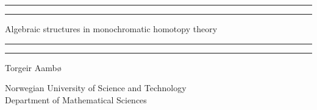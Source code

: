 
\begin{titlingpage}



    \vspace*{5cm}

    \rule[-11pt]{\textwidth}{1pt}
    \rule{\textwidth}{0.5pt}

    \begin{center}
    \Huge Algebraic structures in monochromatic homotopy theory
    \end{center}

    \rule{\textwidth}{0.5pt}
    \rule[11pt]{\textwidth}{1pt}


    \begin{center}
    Torgeir Aambø
    \end{center}



    \vspace{\fill}


    \begin{center}
        Norwegian University of Science and Technology \\
        Department of Mathematical Sciences 
    \end{center}


\end{titlingpage}